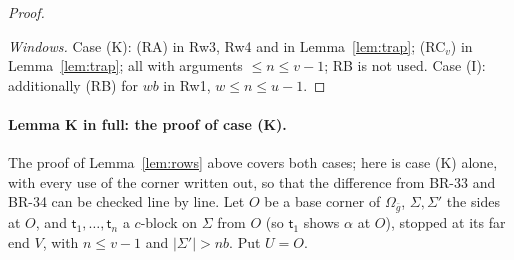 \documentclass[11pt,reqno]{amsart}
\theoremstyle{plain}
\theoremstyle{definition}
\begin{document}
\begin{proof}
\begin{itemize}
\end{itemize}
\emph{Windows.} Case (K): (RA) in Rw3, Rw4 and in Lemma~\ref{lem:trap}; (RC$_v$) in Lemma~\ref{lem:trap}; all with arguments $\le n\le v-1$; RB is not used. Case (I): additionally (RB) for $wb$ in Rw1, $w\le n\le u-1$.
\end{proof}

\paragraph{Lemma K in full: the proof of case (K).} The proof of Lemma~\ref{lem:rows} above covers both cases; here is case (K) alone, with every use of the corner written out, so that the difference from BR-33 and BR-34 can be checked line by line. Let $O$ be a base corner of $\Omega_{\bar g}$, $\Sigma,\Sigma'$ the sides at $O$, and $\mathsf t_1,\dots,\mathsf t_n$ a $c$-block on $\Sigma$ from $O$ (so $\mathsf t_1$ shows $\alpha$ at $O$), stopped at its far end $V$, with $n\le v-1$ and $|\Sigma'|>nb$. Put $U=O$.
\end{document}
